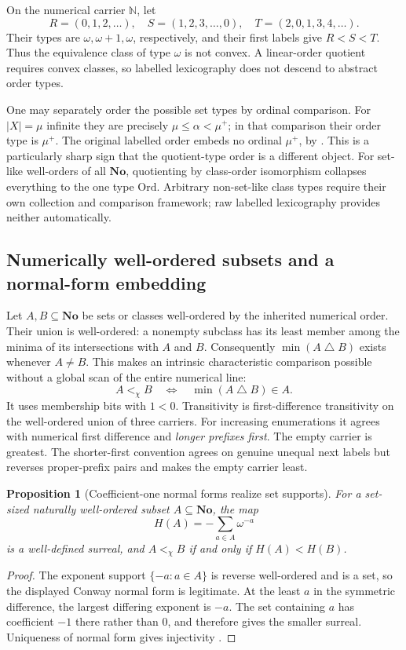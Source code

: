 \documentclass[11pt]{article}
\newtheorem{proposition}[proposition]{Proposition}
\theoremstyle{definition}
\theoremstyle{remark}
\newcommand{\No}{\mathbf{No}}
\newcommand{\Ord}{\mathrm{Ord}}
\begin{document}
On the numerical carrier $\mathbb N$, let
\[
 R=(0,1,2,\ldots),\quad
 S=(1,2,3,\ldots,0),\quad
 T=(2,0,1,3,4,\ldots).
\]
Their types are $\omega,\omega+1,\omega$, respectively, and their first
labels give $R<S<T$. Thus the equivalence class of type $\omega$ is
not convex. A linear-order quotient requires convex classes, so labelled
lexicography does not descend to abstract order types.

One may separately order the possible set types by ordinal comparison.
For $|X|=\mu$ infinite they are precisely $\mu\leq\alpha<\mu^+$;
in that comparison their order type is $\mu^+$. The original labelled
order embeds no ordinal $\mu^+$, by . This is a
particularly sharp sign that the quotient-type order is a different object.
For set-like well-orders of all $\No$, quotienting by class-order
isomorphism collapses everything to the one type $\Ord$. Arbitrary
non-set-like class types require their own collection and comparison
framework; raw labelled lexicography provides neither automatically.

\subsection{Numerically well-ordered subsets and a normal-form embedding}

Let $A,B\subseteq\No$ be sets or classes well-ordered by the inherited
numerical order. Their union is well-ordered: a nonempty subclass has its
least member among the minima of its intersections with $A$ and $B$.
Consequently $\min(A\mathbin\triangle B)$ exists whenever $A\ne B$.
This makes an intrinsic characteristic comparison possible without a
global scan of the entire numerical line:
\[
 A<_{\chi}B\quad\Longleftrightarrow\quad
       \min(A\mathbin\triangle B)\in A.
\]
It uses membership bits with $1<0$. Transitivity is first-difference
transitivity on the well-ordered union of three carriers. For increasing
enumerations it agrees with numerical first difference and \emph{longer
prefixes first}. The empty carrier is greatest. The shorter-first
convention agrees on genuine unequal next labels but reverses proper-prefix
pairs and makes the empty carrier least.

\begin{proposition}[Coefficient-one normal forms realize set supports]\label{swo:cb:prop:hahn}
For a set-sized naturally well-ordered subset $A\subseteq\No$, the map
\[
 H(A)=-\sum_{a\in A}\omega^{-a}
\]
is a well-defined surreal, and $A<_{\chi}B$ if and only if $H(A)<H(B)$.
\end{proposition}
\begin{proof}
The exponent support $\{-a:a\in A\}$ is reverse well-ordered and is
a set, so the displayed Conway normal form is legitimate. At the least
$a$ in the symmetric difference, the largest differing exponent is
$-a$. The set containing $a$ has coefficient $-1$ there rather than
$0$, and therefore gives the smaller surreal. Uniqueness of normal
form gives injectivity \cite{Conway,Gonshor}.
\end{proof}
\end{document}
